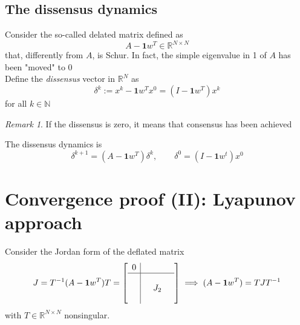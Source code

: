 \documentclass{book}
\newcommand{\R}{\mathbb{R}}
\newcommand{\N}{\mathbb{N}}
\theoremstyle{theoremv2}
\theoremstyle{defv2}
\theoremstyle{remark}
\newtheorem*{remark}{Remark}
\theoremstyle{remark}
\theoremstyle{definition}
\theoremstyle{definition}
\begin{document}
\subsection{The dissensus dynamics}
Consider the so-called delated matrix defined as 
\[
    A- \boldsymbol{1}w^T\in\R^{N\times N}
\]
that, differently from $A$, is Schur. In fact, the simple eigenvalue in 1 of $A$ has been "moved" to 0
\\Define the \emph{dissensus} vector in $\R^N$ as 
\[
    \delta^k := x^k- \boldsymbol{1}w^Tx^0 = (I-\boldsymbol{1}w^T)x^k
\]
for all $k\in\N$
\begin{remark}
    If the dissensus is zero, it means that consensus has been achieved
\end{remark}
The dissensus dynamics is 
\[
    \delta^{k+1} = (A-\boldsymbol{1}w^T)\delta^k, \qquad \delta^0 = (I-\boldsymbol{1}w^t)x^0
\]
\section{Convergence proof (II): Lyapunov approach}
Consider the Jordan form of the deflated matrix
\[
    J = T^{-1} (A-\boldsymbol{1}w^T)T = \left[\begin{array}{c| c c c }
        0 & & & \\ \hline \\ & & J_2 & \\ & & & 
    \end{array}\right] \implies (A-\boldsymbol{1}w^T) = TJT^{-1}
\]
with $T\in\R^{N\times N}$ nonsingular.
\end{document}
